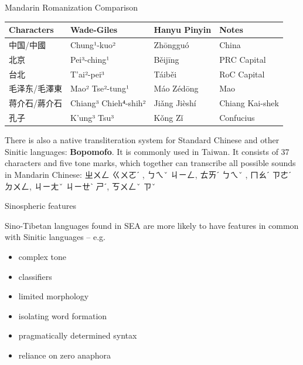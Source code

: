 \documentclass{beamer}
\begin{document}
\begin{frame}{Mandarin Romanization Comparison}
  \begin{tabular}{llll}\small

Characters & Wade-Giles & Hanyu Pinyin & Notes\\ \hline
中国/中國 & Chung¹-kuo² & Zhōngguó & China\\ 
北京 & Pei³-ching¹ & Běijīng & PRC Capital \\
    台北 & T'ai²-pei³ & Táiběi & RoC Capital \\
                                 
毛泽东/毛澤東 & Mao² Tse²-tung¹ & Máo Zédōng & Mao \\
蒋介石/蔣介石 & Chiang³ Chieh⁴-shih² & Jiǎng Jièshí & Chiang Kai-shek \\
孔子 & K'ung³ Tsu³ & Kǒng Zǐ & Confucius \\ 
  \end{tabular}
  \bigskip
  
  There is also a native  transliteration system for Standard Chinese and other Sinitic languages: \textbf{Bopomofo}. It is commonly used in Taiwan. It consists of 37 characters and five tone marks, which together can transcribe all possible sounds in Mandarin Chinese:  ㄓㄨㄥ ㄍㄨㄛˊ , ㄅㄟˇ ㄐㄧㄥ, ㄊㄞˊ ㄅㄟˇ , ㄇㄠˊ ㄗㄜˊ ㄉㄨㄥ,  ㄐㄧㄤˇ ㄐㄧㄝˋ ㄕˊ, ㄎㄨㄥˇ ㄗˇ

  
  
\end{frame}

\begin{frame}{Sinospheric features}

Sino-Tibetan languages found in SEA are more likely to have features in
common with Sinitic languages -- e.g.

\begin{itemize}
\item complex tone
\item classifiers
\item limited morphology
\item isolating word formation
\item pragmatically determined syntax
\item reliance on zero anaphora
\end{itemize}
\end{frame}
\end{document}
